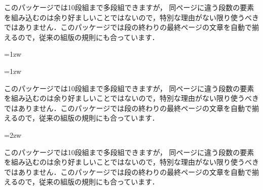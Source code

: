 \begin{inout}
\begin{multicols}{4}
このパッケージでは10段組まで多段組できますが， 同ページに違う段数の要素
を組み込むのは余り好ましいことではないので，特別な理由がない限り使うべき
ではありません．このパッケージでは段の終わりの最終ページの文章を自動で揃
えるので，従来の組版の規則にも合っています．
\end{multicols} 
\end{inout}






%
\begin{intext}
\multicolsep=1zw %
\end{intext}

\begin{inout}
\multicolsep=1zw %
\begin{multicols}{4}
このパッケージでは10段組まで多段組できますが， 同ページに違う段数の要素
を組み込むのは余り好ましいことではないので，特別な理由がない限り使うべき
ではありません．このパッケージでは段の終わりの最終ページの文章を自動で揃
えるので，従来の組版の規則にも合っています．
\end{multicols} 
\multicolsep=2zw %
\begin{multicols}{4}
このパッケージでは10段組まで多段組できますが， 同ページに違う段数の要素
を組み込むのは余り好ましいことではないので，特別な理由がない限り使うべき
ではありません．このパッケージでは段の終わりの最終ページの文章を自動で揃
えるので，従来の組版の規則にも合っています．
\end{multicols} 
\end{inout}